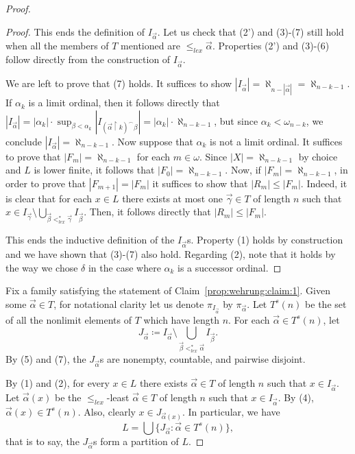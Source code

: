 \documentclass[10pt,a4paper]{amsart}
\begin{document}
\begin{proof}
\begin{proof}
This ends the definition of $I_{\vec{\alpha}}$. Let us check that (2') and (3)-(7) still hold when all the members of $T$ mentioned are $\le_{lex} \vec{\alpha}$. Properties (2') and (3)-(6) follow directly from the construction of $I_{\vec{\alpha}}$. 

We are left to prove that (7) holds. It suffices to show $|I_{\vec{\alpha}}| = \aleph_{n-|\vec{\alpha}|} = \aleph_{n-k-1}$. If $\alpha_k$ is a limit ordinal, then it follows directly that $|I_{\vec{\alpha}}| = |\alpha_k| \cdot \sup_{\beta < \alpha_k} |I_{(\vec{\alpha} \upharpoonright k)^\smallfrown \beta}| = |\alpha_k| \cdot \aleph_{n-k-1}$, but since $\alpha_k < \omega_{n-k}$, we conclude $|I_{\vec{\alpha}}| = \aleph_{n-k-1}$. Now suppose that $\alpha_k$ is not a limit ordinal. It suffices to prove that $|F_m| = \aleph_{n-k-1}$ for each $m \in \omega$. Since $|X| = \aleph_{n-k-1}$ by choice and $L$ is lower finite, it follows that $|F_0| = \aleph_{n-k-1}$. Now, if $|F_m| = \aleph_{n-k-1}$, in order to prove that $|F_{m+1}| = |F_m|$ it suffices to show that $|R_m| \le |F_m|$. Indeed, it is clear that for each $x \in L$ there exists at most one $\vec{\gamma} \in T$ of length $n$ such that $x \in I_{\vec{\gamma}} \setminus \bigcup_{\vec{\beta} <^*_{lex} \vec{\gamma}} I_{\vec{\beta}}$. Then, it follows directly that $|R_m| \le |F_m|$. 

This ends the inductive definition of the $I_{\vec{\alpha}}$s. Property (1) holds by construction and we have shown that (3)-(7) also hold. Regarding (2), note that it holds by the way we chose $\delta$ in the case where $\alpha_k$ is a successor ordinal. 
\end{proof}

Fix a family satisfying the statement of Claim~\ref{prop:wehrung:claim:1}.
Given some $\vec{\alpha} \in T$, for notational clarity let us denote $\pi_{I_{\vec{\alpha}}}$ by $\pi_{\vec{\alpha}}$. Let $T^s(n)$ be the set of all the nonlimit elements of $T$ which have length $n$. For each $\vec{\alpha} \in T^s(n)$, let
\[
J_{\vec{\alpha}} \coloneqq I_{\vec{\alpha}} \setminus \bigcup_{\vec{\beta} <^*_{lex} \vec{\alpha}}I_{\vec{\beta}}.
\]
By (5) and (7), the $J_{\vec{\alpha}}$s are nonempty, countable, and pairwise disjoint.

By (1) and (2), for every $x \in L$ there exists $\vec{\alpha} \in T$ of length $n$ such that $x \in I_{\vec{\alpha}}$. Let $\vec{\alpha}(x)$ be the $\le_{lex}$-least $\vec{\alpha} \in T$ of length $n$ such that $x \in I_{\vec{\alpha}}$. By (4), $\vec{\alpha}(x) \in T^s(n)$. Also,  clearly $x \in J_{\vec{\alpha}(x)}$. In particular, we have
\begin{equation}\label{eq:wehrung}
L = \bigcup \big\{J_{\vec{\alpha}} : \vec{\alpha} \in T^s(n)\big\},
\end{equation}
that is to say, the $J_{\vec{\alpha}}$s form a partition of $L$.


\end{proof}
\end{document}
